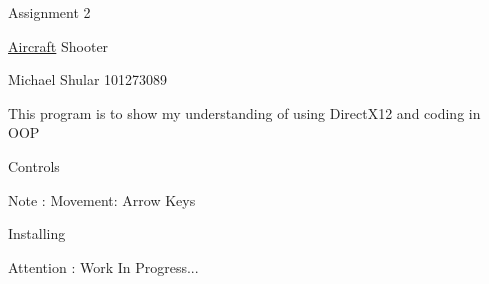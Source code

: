 Assignment 2

\mbox{\hyperlink{class_aircraft}{Aircraft}} Shooter

Michael Shular 101273089

This program is to show my understanding of using Direct\+X12 and coding in OOP

Controls \begin{DoxyNote}{Note}
\+: Movement\+: Arrow Keys
\end{DoxyNote}
Installing \begin{DoxyAttention}{Attention}
\+: Work In Progress... 
\end{DoxyAttention}

